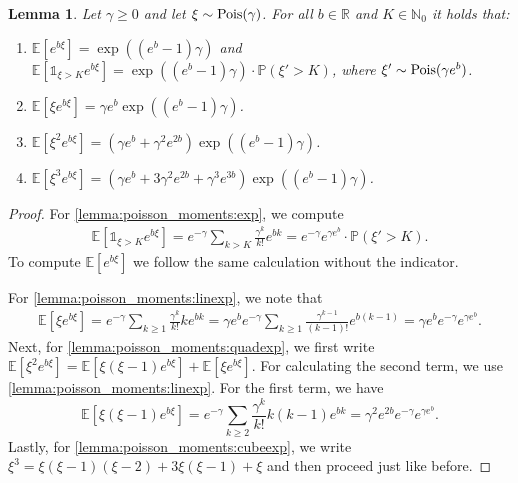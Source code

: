 \documentclass[10pt]{amsart}
\newtheorem{lemma}[theorem]{Lemma}
\theoremstyle{definition}
\theoremstyle{remark}
\newcommand{\ind}[1]{\mathds{1}_{#1}}
\newcommand{\Pois}{\textup{Pois}}
\renewcommand{\P}{\mathbb{P}}
\newcommand{\E}{\mathbb{E}}
\newcommand{\N}{\mathbb{N}}
\newcommand{\R}{\mathbb{R}}
\begin{document}
	\begin{lemma}\label{lemma:poisson_moments}
		Let $\gamma \ge 0$ and let $\xi \sim \Pois(\gamma)$.
		For all $b \in \R$ and $K \in \N_0$ it holds that:
		\begin{enumerate}[(1)]
			\item\label{lemma:poisson_moments:exp} $\E[ e^{b\xi}] =  \exp((e^b-1) \gamma)$ and $\displaystyle \E[\ind{\xi > K} e^{b\xi}] =  \exp((e^b-1) \gamma) \cdot \P(\xi'>K)$, where $\xi' \sim \Pois(\gamma e^b)$.
			\item \label{lemma:poisson_moments:linexp}  $\E[\xi e^{b\xi}] = \gamma e^b \exp((e^b-1) \gamma)$.
			\item \label{lemma:poisson_moments:quadexp}$\displaystyle \E[\xi^2 e^{b\xi}] =  (\gamma e^b + \gamma^2 e^{2b}) \exp((e^b-1) \gamma)$. 
			\item \label{lemma:poisson_moments:cubeexp}$\displaystyle \E[\xi^3 e^{b\xi}] =  (\gamma e^b + 3\gamma^2 e^{2b} + \gamma^3 e^{3b}) \exp((e^b-1) \gamma)$. 
		\end{enumerate}
	\end{lemma}
	\begin{proof}
		For \ref{lemma:poisson_moments:exp}, we compute
		\begin{align*}
			\E[\ind{\xi > K} e^{b \xi}] 
			= e^{-\gamma} \sum_{k > K} \frac{\gamma^k}{k!}  e^{b k} 
			= e^{-\gamma} e^{\gamma e^b}\cdot  \P(\xi'>K).
		\end{align*}
		To compute $\E[e^{b \xi}]$ we follow the same calculation without the indicator. 
		
		For \ref{lemma:poisson_moments:linexp}, we note that
		\begin{align*}
			\E[\xi e^{b \xi}] 
			= e^{-\gamma} \sum_{k \geq 1} \frac{\gamma^k}{k!} k e^{b k} 
			= \gamma e^b e^{-\gamma} \sum_{k \geq 1} \frac{\gamma^{k-1}}{(k-1)!} e^{b (k-1)} 
			= \gamma e^b e^{-\gamma} e^{\gamma e^b}.
		\end{align*}
		Next, for \ref{lemma:poisson_moments:quadexp}, we first write $\E[\xi^2 e^{b\xi}] = \E[\xi (\xi-1) e^{b\xi}] + \E[\xi e^{b\xi}]$.
		For calculating the second term, we use \ref{lemma:poisson_moments:linexp}.
		For the first term, we have
		\[
		\E[\xi (\xi-1) e^{b\xi}] = e^{-\gamma} \sum_{k \ge 2} \frac{\gamma^k}{k!} k (k-1) e^{bk} = \gamma^2 e^{2b} e^{-\gamma} e^{\gamma e^b}.
		\]
		Lastly, for \ref{lemma:poisson_moments:cubeexp}, we write $\xi^3 = \xi(\xi-1)(\xi-2) + 3\xi(\xi-1) + \xi$ and then proceed just like before.
	\end{proof}
	
\end{document}
